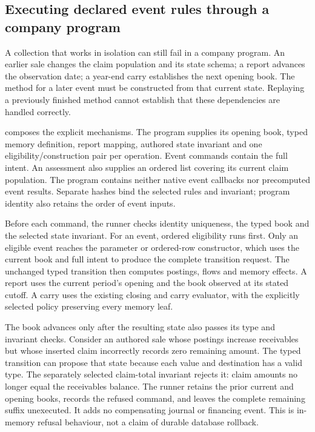 \subsection{Executing declared event rules through a company program}
\label{sec:declarative-event-program}

A collection that works in isolation can still fail in a company program.
An earlier sale changes the claim population and its state schema; a report
advances the observation date; a year-end carry establishes the next opening
book. The method for a later event must be constructed from that current state.
Replaying a previously finished method cannot establish that these dependencies
are handled correctly.

 composes the explicit mechanisms.
The program supplies its opening book, typed memory definition, report mapping,
authored state invariant and one eligibility/construction pair per operation.
Event commands contain the full intent. An assessment also supplies an ordered
list covering its current claim population. The program contains neither native
event callbacks nor precomputed event results. Separate hashes bind the selected
rules and invariant; program identity also retains the order of event inputs.

Before each command, the runner checks identity uniqueness, the typed book and
the selected state invariant. For an event, ordered eligibility runs first.
Only an eligible event reaches the parameter or ordered-row constructor, which
uses the current book and full intent to produce the complete transition
request. The unchanged typed transition then computes postings, flows and
memory effects. A report uses the current period's opening and the book observed
at its stated cutoff. A carry uses the existing closing and carry evaluator,
with the explicitly selected policy preserving every memory leaf.

The book advances only after the resulting state also passes its type and
invariant checks. Consider an authored sale whose postings increase receivables
but whose inserted claim incorrectly records zero remaining amount. The typed
transition can propose that state because each value and destination has a
valid type. The separately selected claim-total invariant rejects it: claim
amounts no longer equal the receivables balance. The runner retains the prior
current and opening books, records the refused command, and leaves the complete
remaining suffix unexecuted. It adds no compensating journal or financing event.
This is in-memory refusal behaviour, not a claim of durable database rollback.

